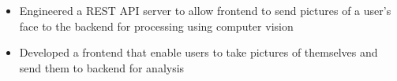 
\begin{itemize}
  \item Engineered a REST API server to allow frontend to send
  pictures of a user’s face to the backend for processing using computer vision
  \item Developed a frontend that enable users to take pictures of themselves
  and send them to backend for analysis
\end{itemize}
